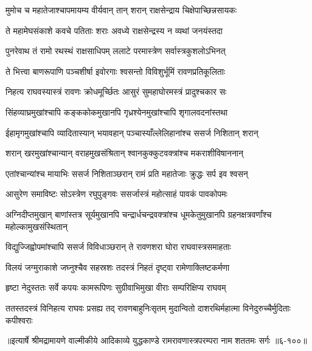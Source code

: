 \twolineshloka
{मुमोच च महातेजाश्चापमायम्य वीर्यवान्}
{तान् शरान् राक्षसेन्द्राय चिक्षेपाच्छिन्नसायकः} %

\twolineshloka
{ते महामेघसंकाशे कवचे पतिताः शराः}
{अवध्ये राक्षसेन्द्रस्य न व्यथां जनयंस्तदा} %

\twolineshloka
{पुनरेवाथ तं रामो रथस्थं राक्षसाधिपम्}
{ललाटे परमास्त्रेण सर्वास्त्रकुशलोऽभिनत्} %

\twolineshloka
{ते भित्त्वा बाणरूपाणि पञ्चशीर्षा इवोरगाः}
{श्वसन्तो विविशुर्भूमिं रावणप्रतिकूलिताः} %

\twolineshloka
{निहत्य राघवस्यास्त्रं रावणः क्रोधमूर्च्छितः}
{आसुरं सुमहाघोरमस्त्रं प्रादुश्चकार सः} %

\twolineshloka
{सिंहव्याघ्रमुखांश्चापि कङ्ककोकमुखानपि}
{गृध्रश्येनमुखांश्चापि शृगालवदनांस्तथा} %

\twolineshloka
{ईहामृगमुखांश्चापि व्यादितास्यान् भयावहान्}
{पञ्चास्याँल्लेलिहानांश्च ससर्ज निशितान् शरान्} %

\twolineshloka
{शरान् खरमुखांश्चान्यान् वराहमुखसंश्रितान्}
{श्वानकुक्कुटवक्त्रांश्च मकराशीविषाननान्} %

\twolineshloka
{एतांश्चान्यांश्च मायाभिः ससर्ज निशिताञ्छरान्}
{रामं प्रति महातेजाः क्रुद्धः सर्प इव श्वसन्} %

\twolineshloka
{आसुरेण समाविष्टः सोऽस्त्रेण रघुपुङ्गवः}
{ससर्जास्त्रं महोत्साहं पावकं पावकोपमः} %

\threelineshloka
{अग्निदीप्तमुखान् बाणांस्तत्र सूर्यमुखानपि}
{चन्द्रार्धचन्द्रवक्त्रांश्च धूमकेतुमुखानपि}
{ग्रहनक्षत्रवर्णांश्च महोल्कामुखसंस्थितान्} %

\twolineshloka
{विद्युज्जिह्वोपमांश्चापि ससर्ज विविधाञ्छरान्}
{ते रावणशरा घोरा राघवास्त्रसमाहताः} %

\twolineshloka
{विलयं जग्मुराकाशे जघ्नुश्चैव सहस्रशः}
{तदस्त्रं निहतं दृष्ट्वा रामेणाक्लिष्टकर्मणा} %

\twolineshloka
{हृष्टा नेदुस्ततः सर्वे कपयः कामरूपिणः}
{सुग्रीवाभिमुखा वीराः सम्परिक्षिप्य राघवम्} %

\twolineshloka
{ततस्तदस्त्रं विनिहत्य राघवः प्रसह्य तद् रावणबाहुनिःसृतम्}
{मुदान्वितो दाशरथिर्महात्मा विनेदुरुच्चैर्मुदिताः कपीश्वराः} %


॥इत्यार्षे श्रीमद्रामायणे वाल्मीकीये आदिकाव्ये युद्धकाण्डे रामरावणास्त्रपरम्परा नाम शततमः सर्गः ॥६-१००॥
